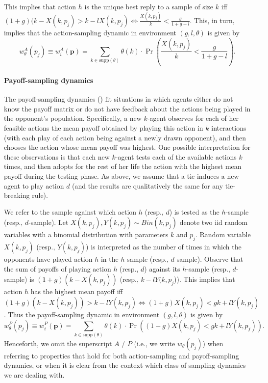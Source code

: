 \documentclass[12pt]{article}
\numberwithin{equation}{section}
\numberwithin{figure}{section}
\theoremstyle{definition}
\theoremstyle{plain}
\theoremstyle{plain}
\theoremstyle{plain}
\theoremstyle{remark}
\theoremstyle{plain}
\theoremstyle{plain}
\def\t{\theta}
\begin{document}
This implies that action $h$ is the unique best reply to a sample of size $k$ iff $(1+g)(k-X(k,p_j)>k-lX(k,p_j)\Leftrightarrow \frac{X(k,p_j)}{k}<\frac{g}{1+g-l}$. This, in turn, implies that the action-sampling dynamic in environment $(g,l,\t)$ is given by
\begin{equation}
w_\theta^{A}\left(p_{j}\right)\equiv w_{i}^{A}\left(\textbf{p}\right) = \sum_{k\in \text{supp}\left(\theta\right)}\theta(k)\cdot\Pr\left(\frac{X\left(k,p_{j}\right)}{k}<\frac{g}{1+g-l}\right).\label{eq:action-sampling0dyanmics}
\end{equation}

\paragraph{Payoff-sampling dynamics}
The payoff-sampling dynamics (\citealp{osborne1998games}) fit situations in which agents either do not know the payoff matrix or do not have feedback about the actions being played in the opponent's population. Specifically, a new $k$-agent observes for each of her feasible actions the mean payoff obtained by playing this action in $k$ interactions (with each play of each action being against a newly drawn opponent), and then chooses the action whose mean payoff was highest. One possible interpretation for these observations is that each new $k$-agent tests each of the available actions $k$ times, and then adopts for the rest of her life the action with the highest mean payoff during the testing phase. As above, we assume that a tie induces a new agent to play  action $d$ (and the results are qualitatively the same for any tie-breaking rule). 

We refer to the sample against which action $h$ (resp.,
$d$) is tested as the $h$-sample (resp., $d$-sample). Let $X(k,p_j),Y(k,p_{j})\sim Bin\left(k,p_{j}\right)$
denote two iid random variables with a binomial distribution with parameters $k$ and $p_{j}$. Random variable $X(k,p_j)$ (resp., $Y(k,p_j)$) is interpreted as the number of times in which the opponents have played action $h$ in the $h$-sample (resp., $d$-sample). 
Observe that the sum of payoffs of playing action $h$ (resp., $d$) against its $h$-sample (resp., $d$-sample) is $(1+g)(k-X(k,p_j))$ 
(resp., $k-l Y(k,p_j$)).
This implies that action $h$ has the highest mean payoff  iff
$(1+g)(k-X(k,p_j))>k-lY(k,p_j)\Leftrightarrow (1+g)X(k,p_j)<gk+lY(k,p_j)$. Thus the payoff-sampling dynamic in environment $(g,l,\t)$ is given by
\begin{equation}
w_\theta^{P}\left(p_{j}\right)\equiv w_i^{P}\left(\textbf{p}\right) =\sum_{k\in \text{supp}\left(\theta\right)}\theta(k)\cdot\Pr((1+g)X(k,p_j)<gk+lY(k,p_j)).\label{eq:payoff-smapling-dynamics}    
\end{equation}
Henceforth, we omit the superscript $A$ / $P$ (i.e., we write $w_\theta(p_j)$) when referring to properties that hold for both action-sampling and payoff-sampling dynamics, 
or when it is clear from the context which class of sampling dynamics we are dealing with.
\end{document}

